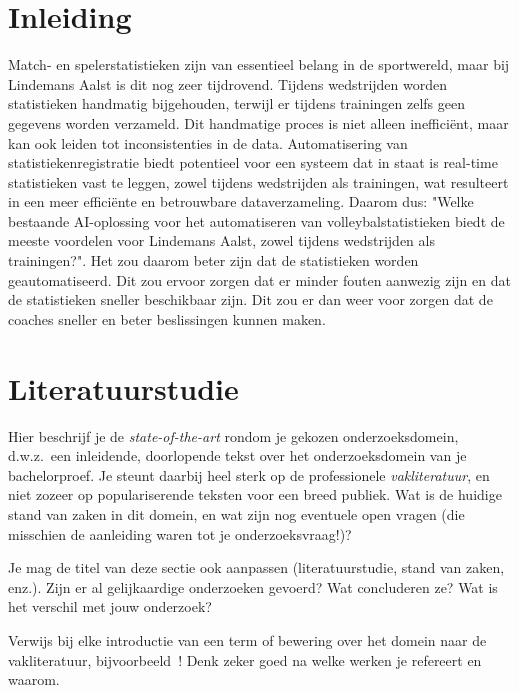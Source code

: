 
\section{Inleiding}%
\label{sec:inleiding}

Match- en spelerstatistieken zijn van essentieel belang in de sportwereld, maar bij Lindemans Aalst is dit nog zeer tijdrovend. Tijdens wedstrijden worden statistieken handmatig bijgehouden, terwijl er tijdens trainingen zelfs geen gegevens worden verzameld. Dit handmatige proces is niet alleen inefficiënt, maar kan ook leiden tot inconsistenties in de data. Automatisering van statistiekenregistratie biedt potentieel voor een systeem dat in staat is real-time statistieken vast te leggen, zowel tijdens wedstrijden als trainingen, wat resulteert in een meer efficiënte en betrouwbare dataverzameling. Daarom dus: "Welke bestaande AI-oplossing voor het automatiseren van volleybalstatistieken biedt de meeste voordelen voor Lindemans Aalst, zowel tijdens wedstrijden als trainingen?". Het zou daarom beter zijn dat de statistieken worden geautomatiseerd. Dit zou ervoor zorgen dat er minder fouten aanwezig zijn en dat de statistieken sneller beschikbaar zijn. Dit zou er dan weer voor zorgen dat de coaches sneller en beter beslissingen kunnen maken.


\section{Literatuurstudie}%
\label{sec:literatuurstudie}

Hier beschrijf je de \emph{state-of-the-art} rondom je gekozen onderzoeksdomein, d.w.z.\ een inleidende, doorlopende tekst over het onderzoeksdomein van je bachelorproef. Je steunt daarbij heel sterk op de professionele \emph{vakliteratuur}, en niet zozeer op populariserende teksten voor een breed publiek. Wat is de huidige stand van zaken in dit domein, en wat zijn nog eventuele open vragen (die misschien de aanleiding waren tot je onderzoeksvraag!)?

Je mag de titel van deze sectie ook aanpassen (literatuurstudie, stand van zaken, enz.). Zijn er al gelijkaardige onderzoeken gevoerd? Wat concluderen ze? Wat is het verschil met jouw onderzoek?

Verwijs bij elke introductie van een term of bewering over het domein naar de vakliteratuur, bijvoorbeeld~\autocite{Hykes2013}! Denk zeker goed na welke werken je refereert en waarom.

